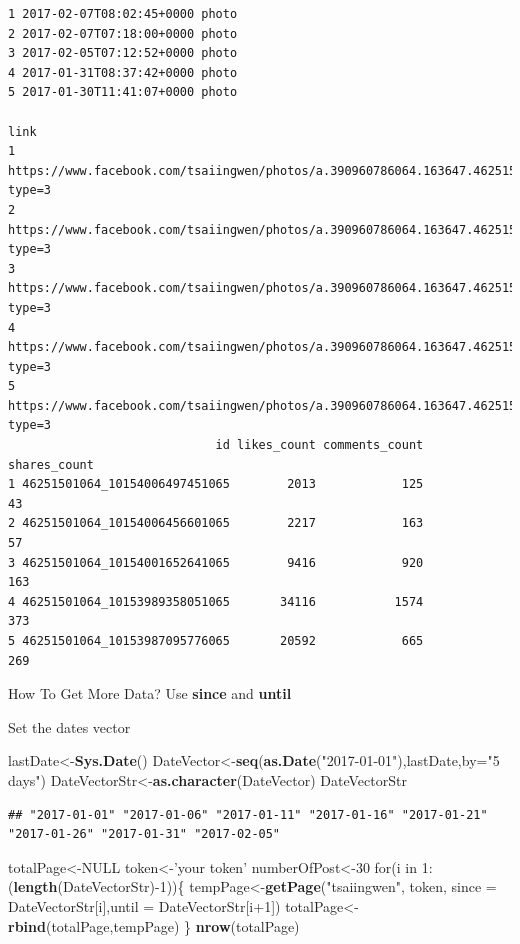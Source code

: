 \documentclass[]{book}
\newenvironment{Shaded}{\begin{snugshade}}{\end{snugshade}}
\newcommand{\KeywordTok}[1]{\textcolor[rgb]{0.13,0.29,0.53}{\textbf{{#1}}}}
\newcommand{\DataTypeTok}[1]{\textcolor[rgb]{0.13,0.29,0.53}{{#1}}}
\newcommand{\DecValTok}[1]{\textcolor[rgb]{0.00,0.00,0.81}{{#1}}}
\newcommand{\StringTok}[1]{\textcolor[rgb]{0.31,0.60,0.02}{{#1}}}
\newcommand{\OtherTok}[1]{\textcolor[rgb]{0.56,0.35,0.01}{{#1}}}
\newcommand{\NormalTok}[1]{{#1}}
\theoremstyle{definition}
\theoremstyle{definition}
\theoremstyle{remark}
\begin{document}
\begin{verbatim}
1 2017-02-07T08:02:45+0000 photo
2 2017-02-07T07:18:00+0000 photo
3 2017-02-05T07:12:52+0000 photo
4 2017-01-31T08:37:42+0000 photo
5 2017-01-30T11:41:07+0000 photo
                                                                                                    link
1 https://www.facebook.com/tsaiingwen/photos/a.390960786064.163647.46251501064/10154006497206065/?type=3
2 https://www.facebook.com/tsaiingwen/photos/a.390960786064.163647.46251501064/10154006455396065/?type=3
3 https://www.facebook.com/tsaiingwen/photos/a.390960786064.163647.46251501064/10154001652641065/?type=3
4 https://www.facebook.com/tsaiingwen/photos/a.390960786064.163647.46251501064/10153989357181065/?type=3
5 https://www.facebook.com/tsaiingwen/photos/a.390960786064.163647.46251501064/10153987089121065/?type=3
                             id likes_count comments_count shares_count
1 46251501064_10154006497451065        2013            125           43
2 46251501064_10154006456601065        2217            163           57
3 46251501064_10154001652641065        9416            920          163
4 46251501064_10153989358051065       34116           1574          373
5 46251501064_10153987095776065       20592            665          269
\end{verbatim}

How To Get More Data? Use \textbf{since} and \textbf{until}

Set the dates vector

\begin{Shaded}
\begin{Highlighting}[]
\NormalTok{lastDate<-}\KeywordTok{Sys.Date}\NormalTok{()}
\NormalTok{DateVector<-}\KeywordTok{seq}\NormalTok{(}\KeywordTok{as.Date}\NormalTok{(}\StringTok{"2017-01-01"}\NormalTok{),lastDate,}\DataTypeTok{by=}\StringTok{"5 days"}\NormalTok{)}
\NormalTok{DateVectorStr<-}\KeywordTok{as.character}\NormalTok{(DateVector)}
\NormalTok{DateVectorStr}
\end{Highlighting}
\end{Shaded}

\begin{verbatim}
## "2017-01-01" "2017-01-06" "2017-01-11" "2017-01-16" "2017-01-21" "2017-01-26" "2017-01-31" "2017-02-05"
\end{verbatim}

\begin{Shaded}
\begin{Highlighting}[]
\NormalTok{totalPage<-}\OtherTok{NULL}
\NormalTok{token<-}\StringTok{'your token'}
\NormalTok{numberOfPost<-}\DecValTok{30}
\NormalTok{for(i in }\DecValTok{1}\NormalTok{:(}\KeywordTok{length}\NormalTok{(DateVectorStr)-}\DecValTok{1}\NormalTok{))\{}
    \NormalTok{tempPage<-}\KeywordTok{getPage}\NormalTok{(}\StringTok{"tsaiingwen"}\NormalTok{, token,}
                      \DataTypeTok{since =} \NormalTok{DateVectorStr[i],}\DataTypeTok{until =} \NormalTok{DateVectorStr[i}\DecValTok{+1}\NormalTok{])}
    \NormalTok{totalPage<-}\KeywordTok{rbind}\NormalTok{(totalPage,tempPage)}
\NormalTok{\}}
\KeywordTok{nrow}\NormalTok{(totalPage)}
\end{Highlighting}
\end{Shaded}
\end{document}
